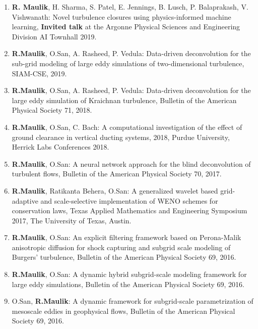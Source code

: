 \documentclass[letterpaper]{article}
\begin{document}
\begin{enumerate}
\item \textbf{R. Maulik}, H. Sharma, S. Patel, E. Jennings, B. Lusch, P. Balaprakash, V. Vishwanath: Novel turbulence closures using physics-informed machine learning, \textbf{Invited talk} at the Argonne Physical Sciences and Engineering Division AI Townhall 2019. 

\item \textbf{R.Maulik}, O.San, A. Rasheed, P. Vedula: Data-driven deconvolution for the sub-grid modeling of large eddy simulations of two-dimensional turbulence, SIAM-CSE, 2019.

\item \textbf{R.Maulik}, O.San, A. Rasheed, P. Vedula: Data-driven deconvolution for the large eddy simulation of Kraichnan turbulence, Bulletin of the American Physical Society 71, 2018.

\item \textbf{R.Maulik}, O.San, C. Bach: A computational investigation of the effect of ground clearance in vertical ducting systems, 2018, Purdue University, Herrick Labs Conferences 2018. 

\item \textbf{R.Maulik}, O.San: A neural network approach for the blind deconvolution of turbulent flows, Bulletin of the American Physical Society 70, 2017.

\item \textbf{R.Maulik}, Ratikanta Behera, O.San: A generalized wavelet based grid-adaptive and scale-selective
implementation of WENO schemes for conservation laws, Texas Applied Mathematics and Engineering Symposium 2017, The University of Texas, Austin.

\item \textbf{R.Maulik}, O.San: An explicit filtering framework based on Perona-Malik anisotropic diffusion for shock capturing and subgrid scale modeling of Burgers' turbulence, Bulletin of the American Physical Society 69, 2016.

\item \textbf{R.Maulik}, O.San:  A dynamic hybrid subgrid-scale modeling framework for large eddy simulations, Bulletin of the American Physical Society 69, 2016.

\item O.San, \textbf{R.Maulik}: A dynamic framework for subgrid-scale parametrization of mesoscale eddies in geophysical flows, Bulletin of the American Physical Society 69, 2016.

\end{enumerate}
\end{document}
